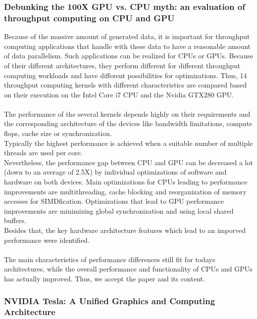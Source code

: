 \documentclass[12pt]{article}
\begin{document}
\subsubsection*{Debunking the 100X GPU vs. CPU myth: an evaluation of throughput computing on CPU and GPU}
Because of the massive amount of generated data, it is important for throughput computing applications that handle with these data to have a reasonable amount of data parallelism. Such applications can be realized for CPUs or GPUs. Because of their different architectures, they perform different for different throughput computing workloads and have different possibilities for optimizations. Thus, 14 throughput computing kernels with different characteristics are compared based on their execution on the Intel Core i7 CPU and the Nvidia GTX280 GPU.\\\\
The performance of the several kernels depends highly on their requirements and the corresponding architecture of the devices like bandwidth limitations, compute flops, cache size or synchronization.\\
Typically the highest performance is achieved when a suitable number of multiple threads are used per core.\\
Nevertheless, the performance gap between CPU and GPU can be decreased a lot (down to an average of 2.5X) by individual optimizations of software and hardware on both devices. Main optimizations for CPUs leading to performance improvements are multithreading, cache blocking and reorganization of memory accesses for SIMDfication. Optimizations that lead to GPU performance improvements are minimizing global synchronization and using local shared buffers.\\
Besides that, the key hardware architecture features which lead to an imporved performance were identified.\\\\
The main characteristics of performance differences still fit for todays architectures, while the overall performance and functionality of CPUs and GPUs has actually improved. Thus, we accept the paper and its content.

\vspace{10pt}


\subsubsection*{NVIDIA Tesla: A Unified Graphics and Computing Architecture}
\end{document}
